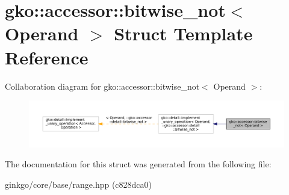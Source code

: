 \hypertarget{structgko_1_1accessor_1_1bitwise__not}{}\section{gko\+:\+:accessor\+:\+:bitwise\+\_\+not$<$ Operand $>$ Struct Template Reference}
\label{structgko_1_1accessor_1_1bitwise__not}


Collaboration diagram for gko\+:\+:accessor\+:\+:bitwise\+\_\+not$<$ Operand $>$\+:
\nopagebreak
\begin{figure}[H]
\begin{center}
\leavevmode
\includegraphics[width=350pt]{structgko_1_1accessor_1_1bitwise__not__coll__graph}
\end{center}
\end{figure}


The documentation for this struct was generated from the following file\+:\begin{DoxyCompactItemize}
\item 
ginkgo/core/base/range.\+hpp (c828dca0)\end{DoxyCompactItemize}
